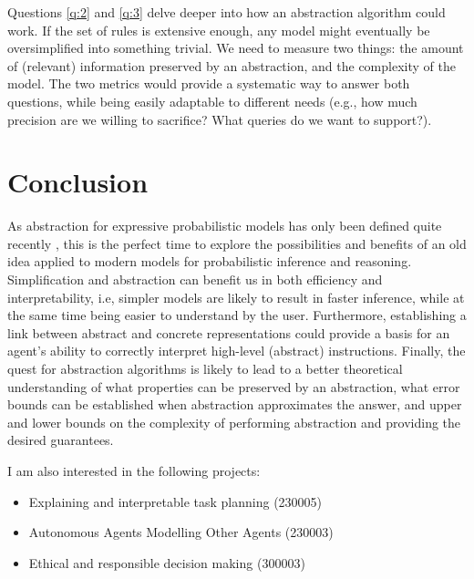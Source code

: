 \documentclass{article}
\begin{document}
Questions \ref{q:2} and \ref{q:3} delve deeper into how an abstraction algorithm
could work. If the set of rules is extensive enough, any model might
eventually be oversimplified into something trivial. We need to measure two
things: the amount of (relevant) information preserved by an abstraction, and
the complexity of the model. The two metrics would provide a systematic way to
answer both questions, while being easily adaptable to different needs (e.g.,
how much precision are we willing to sacrifice? What queries do we want to
support?).

\section{Conclusion}

As abstraction for expressive probabilistic models has only been defined quite
recently \cite{DBLP:journals/corr/abs-1810-02434,DBLP:conf/uai/HoltzenMB17},
this is the perfect time to explore the possibilities and benefits of an old
idea applied to modern models for probabilistic inference and reasoning.
Simplification and abstraction can benefit us in both efficiency and
interpretability, i.e, simpler models are likely to result in faster inference,
while at the same time being easier to understand by the user. Furthermore,
establishing a link between abstract and concrete representations could provide
a basis for an agent's ability to correctly interpret high-level (abstract)
instructions. Finally, the quest for abstraction algorithms is likely to lead to
a better theoretical understanding of what properties can be preserved by an
abstraction, what error bounds can be established when abstraction approximates
the answer, and upper and lower bounds on the complexity of performing
abstraction and providing the desired guarantees.

I am also interested in the following projects:
\begin{itemize}
\item Explaining and interpretable task planning (230005)
\item Autonomous Agents Modelling Other Agents (230003)
\item Ethical and responsible decision making (300003)
\end{itemize}



\end{document}
